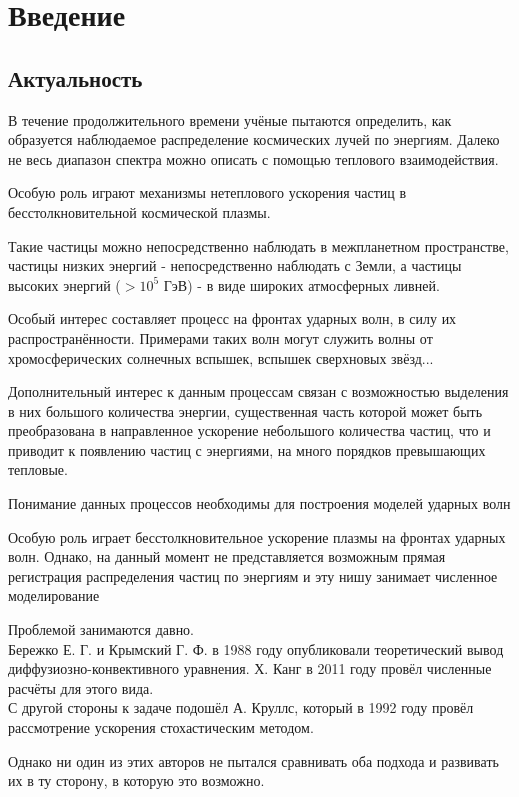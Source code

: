 \documentclass[a4paper,11pt]{article} %
\begin{document}
\tableofcontents
\newpage
\section{Введение}
\subsection{Актуальность}
В течение продолжительного времени учёные пытаются определить, как образуется наблюдаемое распределение космических лучей по энергиям. Далеко не весь диапазон спектра можно описать с помощью теплового взаимодействия.

Особую роль играют механизмы нетеплового ускорения частиц в бесстолкновительной космической плазмы. 

Такие частицы можно непосредственно наблюдать в межпланетном пространстве, частицы низких энергий - непосредственно наблюдать с Земли, а частицы высоких энергий ($>10^5$ ГэВ) - в виде широких атмосферных ливней.

Особый интерес составляет процесс на фронтах ударных волн, в силу их распространённости.
Примерами таких волн могут служить волны от хромосферических солнечных вспышек, вспышек сверхновых звёзд...

Дополнительный интерес к данным процессам связан с возможностью выделения в них большого количества энергии, существенная часть которой может быть преобразована в направленное ускорение небольшого количества частиц, что и приводит к появлению частиц с энергиями, на много порядков превышающих тепловые.

Понимание данных процессов необходимы для построения моделей ударных волн

Особую роль играет бесстолкновительное ускорение плазмы на фронтах ударных волн. Однако, на данный момент не представляется возможным прямая регистрация распределения частиц по энергиям и эту нишу занимает численное моделирование

Проблемой занимаются давно.\\
 Бережко Е. Г. и Крымский Г. Ф. в 1988 году опубликовали теоретический вывод диффузиозно-конвективного уравнения. Х. Канг в 2011 году провёл численные расчёты для этого вида. \\ 
С другой стороны к задаче подошёл А. Круллс, который в 1992 году провёл рассмотрение ускорения стохастическим методом. 

Однако ни один из этих авторов не пытался сравнивать оба подхода и развивать их в ту сторону, в которую это возможно.
\end{document}
